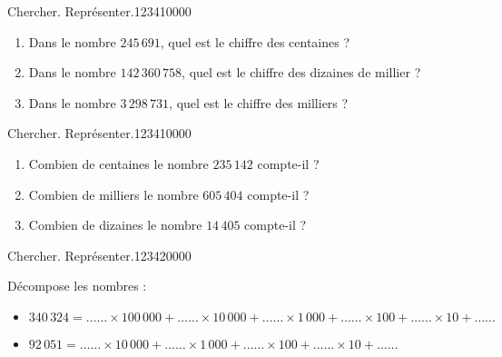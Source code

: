 \begin{pageAD}
\begin{ExoCad}{Chercher. Représenter.}{1234}{1}{0}{0}{0}{0}
\begin{enumerate}[leftmargin=*]
\item Dans le nombre $245\,691$, quel est le chiffre des centaines ?   
\item Dans le nombre $142\,360\,758$, quel est le chiffre des dizaines de millier ? 
\item Dans le nombre $3\,298\,731$, quel est le chiffre des milliers ?
\end{enumerate} 


\end{ExoCad} 
  
 
 
 
\begin{ExoCad}{Chercher. Représenter.}{1234}{1}{0}{0}{0}{0}
 
\begin{enumerate}[leftmargin=*]
\item Combien de centaines le nombre $235\,142$ compte-il ? 
\item Combien de milliers le nombre $605\,404$ compte-il ?
\item Combien de dizaines le nombre $14\,405$ compte-il ?
\end{enumerate} 
\end{ExoCad}
  
 
\begin{ExoCad}{Chercher. Représenter.}{1234}{2}{0}{0}{0}{0}
 
 Décompose les nombres :
 
\begin{itemize}[leftmargin=*]
\item $340\,324 = \ldots\ldots \times 100\,000+\ldots\ldots \times 10\,000+\ldots\ldots \times 1\,000+\ldots\ldots \times 100+\ldots\ldots \times 10+\ldots\ldots$
\item $92\,051 = \ldots\ldots \times 10\,000+\ldots\ldots \times 1\,000+\ldots\ldots \times 100+\ldots\ldots \times 10+\ldots\ldots$
\end{itemize} 

\end{ExoCad}




\end{pageAD} 


